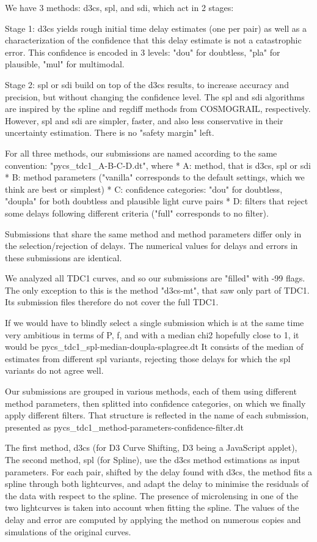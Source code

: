 \documentclass[traditabstract]{aa}
\begin{document}
We have 3 methods: d3cs, spl, and sdi, which act in 2 stages:

Stage 1: d3cs yields rough initial time delay estimates (one per pair) as well as a characterization of the confidence that this delay estimate is not a catastrophic error. This confidence is encoded in 3 levels: "dou" for doubtless, "pla" for plausible, "mul" for multimodal.

Stage 2: spl or sdi build on top of the d3cs results, to increase accuracy and precision, but without changing the confidence level. The spl and sdi algorithms are inspired by the spline and regdiff methods from COSMOGRAIL, respectively. However, spl and sdi are simpler, faster, and also less conservative in their uncertainty estimation. There is no "safety margin" left.

For all three methods, our submissions are named according to the same convention: "pycs\_tdc1\_A-B-C-D.dt", where
 * A: method, that is d3cs, spl or sdi
 * B: method parameters ("vanilla" corresponds to the default settings, which we think are best or simplest)
 * C: confidence categories: "dou" for doubtless, "doupla" for both doubtless and plausible light curve pairs
 * D: filters that reject some delays following different criteria ("full" corresponds to no filter).

Submissions that share the same method and method parameters differ only in the selection/rejection of delays. The numerical values for delays and errors in these submissions are identical.

We analyzed all TDC1 curves, and so our submissions are "filled" with -99 flags. The only exception to this is the method "d3cs-mt", that saw only part of TDC1. Its submission files therefore do not cover the full TDC1.

If we would have to blindly select a single submission which is at the same time very ambitious in terms of P, f, and with a median chi2 hopefully close to 1, it would be
pycs\_tdc1\_spl-median-doupla-splagree.dt
It consists of the median of estimates from different spl variants, rejecting those delays for which the spl variants do not agree well.


Our submissions are grouped in various methods, each of them using different method parameters, then splitted into confidence categories, on which we finally apply different filters. That structure is reflected in the name of each submission, presented as pycs\_tdc1\_method-parameters-confidence-filter.dt

The first method, d3cs (for D3 Curve Shifting, D3 being a JavaScript applet), 
The second method, spl (for Spline), use the d3cs method estimations as input parameters. For each pair, shifted by the delay found with d3cs, the method fits a spline through both lightcurves, and adapt the delay to minimise the residuals of the data with respect to the spline. The presence of microlensing in one of the two lightcurves is taken into account when fitting the spline. The values of the delay and error are computed by applying the method on numerous copies and simulations of the original curves.
\end{document}
